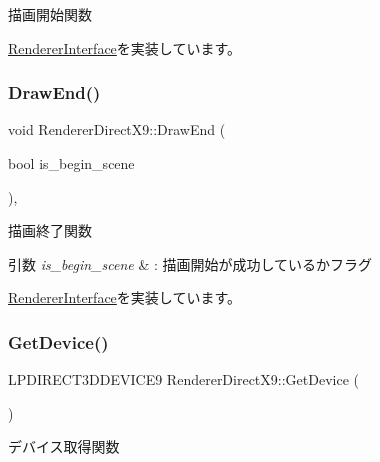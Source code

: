 描画開始関数 



\mbox{\hyperlink{class_renderer_interface_a86a487deb4e4207a67410d00ec670fd7}{Renderer\+Interface}}を実装しています。

\mbox{\label{class_renderer_direct_x9_a5f934597020f77dc9cf729acfb13a830}} 
\subsubsection{\texorpdfstring{Draw\+End()}{DrawEnd()}}
{\footnotesize\ttfamily void Renderer\+Direct\+X9\+::\+Draw\+End (\begin{DoxyParamCaption}\item[{bool}]{is\+\_\+begin\+\_\+scene }\end{DoxyParamCaption})\hspace{0.3cm}{\ttfamily [override]}, {\ttfamily [virtual]}}



描画終了関数 


\begin{DoxyParams}{引数}
{\em is\+\_\+begin\+\_\+scene} & \+: 描画開始が成功しているかフラグ \\
\hline
\end{DoxyParams}


\mbox{\hyperlink{class_renderer_interface_a0034a44420e4746062e70e4d66d3bee2}{Renderer\+Interface}}を実装しています。

\mbox{\label{class_renderer_direct_x9_a718458c1493c7d6814e01847e2e4164d}} 
\subsubsection{\texorpdfstring{Get\+Device()}{GetDevice()}}
{\footnotesize\ttfamily L\+P\+D\+I\+R\+E\+C\+T3\+D\+D\+E\+V\+I\+C\+E9 Renderer\+Direct\+X9\+::\+Get\+Device (\begin{DoxyParamCaption}{ }\end{DoxyParamCaption})}



デバイス取得関数 


